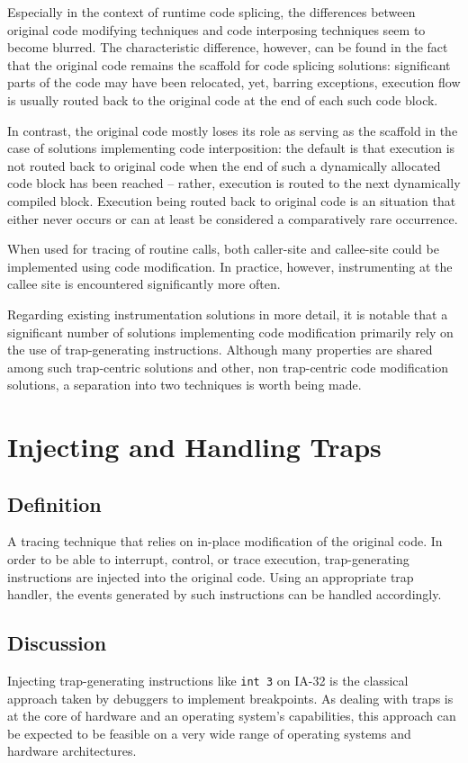 Especially in the context of runtime code splicing, the differences between
original code modifying techniques and code interposing techniques seem
to become blurred. The characteristic difference, however, can be found in the 
fact that the original code remains the scaffold for code splicing solutions:
significant parts of the code may have been relocated, yet, barring exceptions, 
execution flow is usually routed back to the original code at the end of each such
code block.

In contrast, the original code mostly loses its role as serving as the scaffold 
in the case of solutions implementing code interposition: the default is
that execution is not routed back to original code when the end of such a dynamically
allocated code block has been reached -- rather, execution is routed 
to the next dynamically compiled block. Execution being routed back to original 
code is an situation that either never occurs or can at least be considered a comparatively rare occurrence.

When used for tracing of routine calls, both caller-site and callee-site 
could be implemented using code modification. In practice, however, instrumenting at
the callee site is encountered significantly more often.

Regarding existing instrumentation solutions in more detail, it is notable that a significant number of 
solutions implementing code modification primarily rely on the use of trap-generating
instructions. Although many properties are shared among such trap-centric solutions and other, non trap-centric 
code modification solutions, a separation into two techniques is worth being made.

\section{Injecting and Handling Traps}
\subsection*{Definition}
A tracing technique that relies on in-place modification of the original code. 
In order to be able to interrupt, control, or trace execution, trap-generating instructions
are injected into the original code. Using an appropriate trap handler, the
events generated by such instructions can be handled accordingly. 


\subsection*{Discussion}
Injecting trap-generating instructions like \verb|int 3| on IA-32 is the classical
approach taken by debuggers to implement breakpoints. As dealing with traps is at
the core of hardware and an operating system's capabilities, this approach can be expected to
be feasible on a very wide range of operating systems and hardware architectures. 

